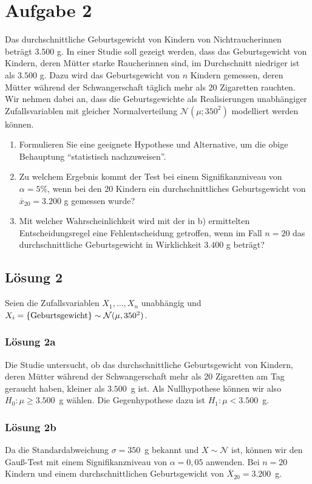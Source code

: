 \documentclass[main.tex]{subfiles}
\begin{document}
\section{Aufgabe 2}
Das durchschnittliche Geburtsgewicht von Kindern von Nichtraucherinnen beträgt $3.500$ g. In einer Studie soll gezeigt werden, dass das Geburtsgewicht von Kindern, deren Mütter starke Raucherinnen sind, im Durchschnitt niedriger ist als $3.500$ g. Dazu wird das Geburtsgewicht von $n$ Kindern gemessen, deren Mütter während der Schwangerschaft täglich mehr als $20$ Zigaretten rauchten. Wir nehmen dabei an, dass die Geburtsgewichte als Realisierungen unabhängiger Zufallsvariablen mit gleicher Normalverteilung $\mathcal{N}(\mu; 350^2)$ modelliert werden können.
\begin{enumerate}
\item Formulieren Sie eine geeignete Hypothese und Alternative, um die obige Behauptung "`statistisch nachzuweisen"'.
\item Zu welchem Ergebnis kommt der Test bei einem Signifikanzniveau von $\alpha = 5\%$, wenn bei den $20$ Kindern ein durchschnittliches Geburtsgewicht von $\overline{x}_{20} = 3.200$ g gemessen wurde?
\item Mit welcher Wahrscheinlichkeit wird mit der in b) ermittelten Entscheidungsregel eine Fehlentscheidung getroffen, wenn im Fall $n = 20$ das durchschnittliche Geburtsgewicht in Wirklichkeit $3.400$ g beträgt?
\end{enumerate}

\subsection{Lösung 2}
Seien die Zufallsvariablen $X_1, \dots, X_n$ unabhängig und $X_i = \{\text{Geburtsgewicht}\}\sim \mathcal{N}(\mu, 350^2)$.\\

\subsubsection{Lösung 2a}
Die Studie untersucht, ob das durchschnittliche Geburtsgewicht von Kindern, deren Mütter während der Schwangerschaft mehr als 20 Zigaretten am Tag geraucht haben, kleiner als $3.500$~g ist. Als Nullhypothese können wir also $H_0: \mu \geq 3.500$~g wählen. Die Gegenhypothese dazu ist $H_1: \mu < 3.500$~g.

\subsubsection{Lösung 2b}
Da die Standardabweichung $\sigma = 350$~g bekannt und $X\sim\mathcal{N}$ ist, können wir den Gauß-Test mit einem Signifikanzniveau von $\alpha = 0,05$ anwenden. 
Bei $n=20$ Kindern und einem durchschnittlichen Geburtsgewicht von $\overline{X}_{20} = 3.200$~g. 
\end{document}
